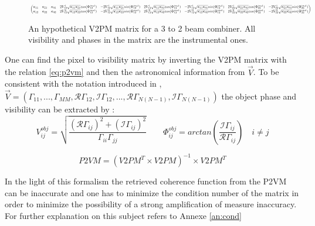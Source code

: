 \begin{figure}[h]
\begin{equation*}
\resizebox{\textwidth}{!}{
 $ \begin{pmatrix}
  \kappa_{11} & \kappa_{21} & \kappa_{31} &
  2V_{12}^{1}\sqrt{\kappa_{11}\kappa_{21}}cos(\Phi_{12}^{inst}) &
  -2V_{12}^{1}\sqrt{\kappa_{11}\kappa_{21}}sin(\Phi_{12}^{inst}) &
  2V_{13}^{1}\sqrt{\kappa_{11}\kappa_{31}}cos(\Phi_{13}^{inst}) &
 - 2V_{13}^{1}\sqrt{\kappa_{11}\kappa_{31}}sin(\Phi_{13}^{inst}) &
  2V_{23}^{1}\sqrt{\kappa_{21}\kappa_{31}}cos(\Phi_{23}^{inst}) & -2V_{23}^{1}\sqrt{\kappa_{21}\kappa_{31}}sin(\Phi_{23}^{inst})\\
  \kappa_{12} & \kappa_{22} & \kappa_{32} &
  2V_{12}^{2}\sqrt{\kappa_{12}\kappa_{22}}cos(\Phi_{12}^{inst}) &
  -2V_{12}^{2}\sqrt{\kappa_{12}\kappa_{22}}sin(\Phi_{12}^{inst}) &
  2V_{13}^{2}\sqrt{\kappa_{12}\kappa_{32}}cos(\Phi_{13}^{inst}) &
 - 2V_{13}^{2}\sqrt{\kappa_{12}\kappa_{32}}sin(\Phi_{13}^{inst}) &
  2V_{23}^{2}\sqrt{\kappa_{22}\kappa_{32}}cos(\Phi_{23}^{inst}) &   -2V_{23}^{2}\sqrt{\kappa_{22}\kappa_{32}}sin(\Phi_{23}^{inst})

\end{pmatrix}
$}
\end{equation*}
\caption{An hypothetical V2PM matrix for a 3 to 2 beam combiner. All visibility and phases in the matrix are the instrumental ones.}
\label{v2pm.expl}
\end{figure}

One can find the pixel to visibility matrix by inverting the V2PM
matrix with the relation \ref{eq:p2vm} and then the astronomical
information from $\vec{V}$. To be consistent with the notation introduced in \cite{saviauk},   $\vec{V} =
(\Gamma_{11},...,\Gamma_{MM},\mathcal{R}\Gamma_{12},\mathcal{I}\Gamma_{12},...,\mathcal{R}\Gamma_{N(N-1)},\mathcal{I}\Gamma_{N(N-1)})$ the object phase and visibility can be extracted by :
$$
V_{ij}^{obj} = \sqrt{\frac{(\mathcal{R}\Gamma_{ij})^2+(\mathcal{I}\Gamma_{ij})^2}{\Gamma_{ii}\Gamma_{jj}}} \qquad
\Phi_{ij}^{obj} = arctan(\frac{\mathcal{I}\Gamma_{ij}}{\mathcal{R}\Gamma_{ij}}) \quad i\neq j
$$

\begin{equation}
  P2VM = (V2PM^T\times V2PM)^{-1}\times V2PM^{T} \label{eq:p2vm}
\end{equation}  

In the light of this formalism the retrieved coherence function from the \gls{P2VM} can be inaccurate and one has to minimize the condition number of the matrix in order to minimize the possibility of a strong amplification of measure inaccuracy. For further explanation on this subject refers to Annexe \ref{an:cond}
